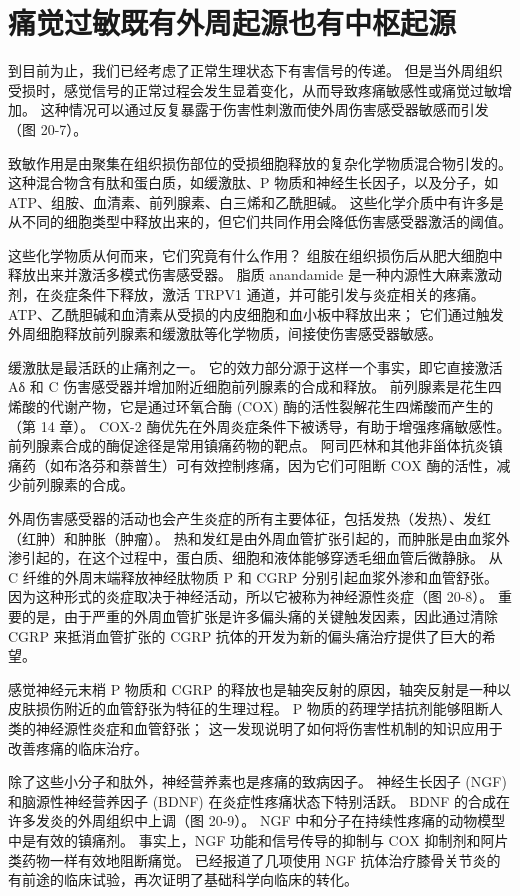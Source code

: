 \section{痛觉过敏既有外周起源也有中枢起源}
到目前为止，我们已经考虑了正常生理状态下有害信号的传递。 但是当外周组织受损时，感觉信号的正常过程会发生显着变化，从而导致疼痛敏感性或痛觉过敏增加。 这种情况可以通过反复暴露于伤害性刺激而使外周伤害感受器敏感而引发（图 20-7）。

致敏作用是由聚集在组织损伤部位的受损细胞释放的复杂化学物质混合物引发的。 这种混合物含有肽和蛋白质，如缓激肽、P 物质和神经生长因子，以及分子，如 ATP、组胺、血清素、前列腺素、白三烯和乙酰胆碱。 这些化学介质中有许多是从不同的细胞类型中释放出来的，但它们共同作用会降低伤害感受器激活的阈值。

这些化学物质从何而来，它们究竟有什么作用？ 组胺在组织损伤后从肥大细胞中释放出来并激活多模式伤害感受器。 脂质 anandamide 是一种内源性大麻素激动剂，在炎症条件下释放，激活 TRPV1 通道，并可能引发与炎症相关的疼痛。 ATP、乙酰胆碱和血清素从受损的内皮细胞和血小板中释放出来； 它们通过触发外周细胞释放前列腺素和缓激肽等化学物质，间接使伤害感受器敏感。

缓激肽是最活跃的止痛剂之一。 它的效力部分源于这样一个事实，即它直接激活 Aδ 和 C 伤害感受器并增加附近细胞前列腺素的合成和释放。 前列腺素是花生四烯酸的代谢产物，它是通过环氧合酶 (COX) 酶的活性裂解花生四烯酸而产生的（第 14 章）。 COX-2 酶优先在外周炎症条件下被诱导，有助于增强疼痛敏感性。 前列腺素合成的酶促途径是常用镇痛药物的靶点。 阿司匹林和其他非甾体抗炎镇痛药（如布洛芬和萘普生）可有效控制疼痛，因为它们可阻断 COX 酶的活性，减少前列腺素的合成。

外周伤害感受器的活动也会产生炎症的所有主要体征，包括发热（发热）、发红（红肿）和肿胀（肿瘤）。 热和发红是由外周血管扩张引起的，而肿胀是由血浆外渗引起的，在这个过程中，蛋白质、细胞和液体能够穿透毛细血管后微静脉。 从 C 纤维的外周末端释放神经肽物质 P 和 CGRP 分别引起血浆外渗和血管舒张。 因为这种形式的炎症取决于神经活动，所以它被称为神经源性炎症（图 20-8）。 重要的是，由于严重的外周血管扩张是许多偏头痛的关键触发因素，因此通过清除 CGRP 来抵消血管扩张的 CGRP 抗体的开发为新的偏头痛治疗提供了巨大的希望。

感觉神经元末梢 P 物质和 CGRP 的释放也是轴突反射的原因，轴突反射是一种以皮肤损伤附近的血管舒张为特征的生理过程。 P 物质的药理学拮抗剂能够阻断人类的神经源性炎症和血管舒张； 这一发现说明了如何将伤害性机制的知识应用于改善疼痛的临床治疗。

除了这些小分子和肽外，神经营养素也是疼痛的致病因子。 神经生长因子 (NGF) 和脑源性神经营养因子 (BDNF) 在炎症性疼痛状态下特别活跃。 BDNF 的合成在许多发炎的外周组织中上调（图 20-9）。 NGF 中和分子在持续性疼痛的动物模型中是有效的镇痛剂。 事实上，NGF 功能和信号传导的抑制与 COX 抑制剂和阿片类药物一样有效地阻断痛觉。 已经报道了几项使用 NGF 抗体治疗膝骨关节炎的有前途的临床试验，再次证明了基础科学向临床的转化。

